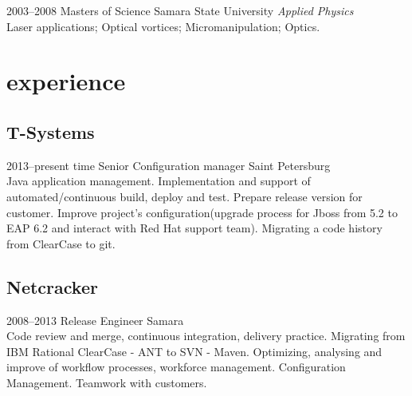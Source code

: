 \documentclass[nocolors]{friggeri-cv-a4}
\begin{document}
\begin{entrylist}

  
\entry
{2003--2008}
{Masters { of Science}}
{Samara State University}
{\emph{Applied Physics} \\ Laser applications; Optical vortices; Micromanipulation; Optics.}

\end{entrylist}


\section{experience}

\subsection{T-Systems}
\begin{entrylist}
\entry
{2013--present time}
{Senior Configuration manager}
{Saint Petersburg}
{\emph{} \\
  Java application management.
  Implementation and support of automated/continuous build, deploy and test.
  Prepare release version for customer.
  Improve project's configuration(upgrade process for Jboss from 5.2 to EAP 6.2 and interact with Red Hat support team).
  Migrating a code history from ClearCase to git. \\
  
}
\end{entrylist}

\subsection{Netcracker}
\begin{entrylist}
\entry
{2008--2013}
{Release Engineer}
{Samara}
{\emph{} \\
  Code review and merge, continuous integration, delivery practice.
  Migrating from IBM Rational ClearCase - ANT to SVN - Maven.
  Optimizing, analysing and improve of workflow processes, workforce management.
  Configuration Management.
  Teamwork with customers.  
}
\end{entrylist}
\end{document}
